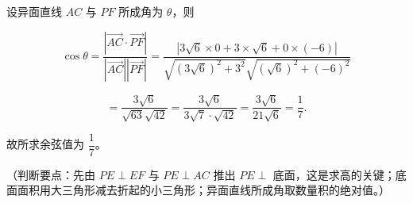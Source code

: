 \begin{answer}
设异面直线 $AC$ 与 $PF$ 所成角为 $\theta$，则

\nopagebreak[4]
\[\cos\theta=\frac{|\overrightarrow{AC}\cdot\overrightarrow{PF}|}{|\overrightarrow{AC}||\overrightarrow{PF}|}=\frac{|3\sqrt6\times0+3\times\sqrt6+0\times(-6)|}{\sqrt{(3\sqrt6)^2+3^2}\sqrt{(\sqrt6)^2+(-6)^2}}\]

\nopagebreak[4]
\[=\frac{3\sqrt6}{\sqrt{63}\sqrt{42}}=\frac{3\sqrt6}{3\sqrt7\cdot\sqrt{42}}=\frac{3\sqrt6}{21\sqrt6}=\frac17.\]

故所求余弦值为 $\dfrac17$。

（判断要点：先由 $PE\perp EF$ 与 $PE\perp AC$ 推出 $PE\perp$ 底面，这是求高的关键；底面面积用大三角形减去折起的小三角形；异面直线所成角取数量积的绝对值。）


\end{answer}

